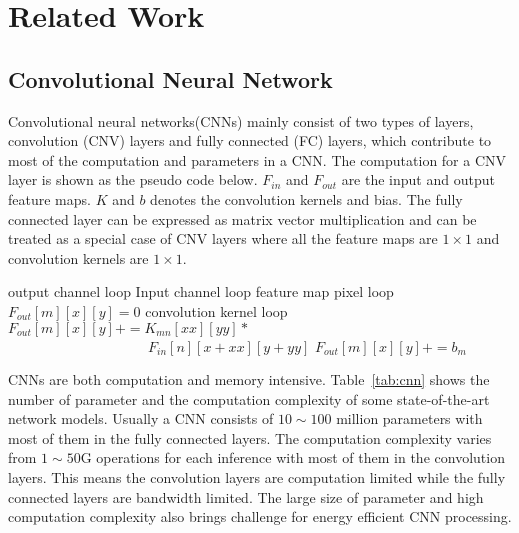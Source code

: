 \section{Related Work}\label{sec:related}


\subsection{Convolutional Neural Network}
Convolutional neural networks(CNNs) mainly consist of two types of layers, convolution (CNV) layers and fully connected (FC) layers, which contribute to most of the computation and parameters in a CNN. The computation for a CNV layer is shown as the pseudo code below. $F_{in}$ and $F_{out}$ are the input and output feature maps. $K$ and $b$ denotes the convolution kernels and bias. The fully connected layer can be expressed as matrix vector multiplication and can be treated as a special case of CNV layers where all the feature maps are $1\times 1$ and convolution kernels are $1\times 1$.

\begin{codebox}
\li \Comment output channel loop
\li {} 
  \Do
\li   \Comment Input channel loop
\li   {}
    \Do
\li  	\Comment feature map pixel loop
\li 	{}
    \Do
\li   	  $F_{out}[m][x][y]=0$
\li 	  \Comment convolution kernel loop
\li 	  {}
          \Do
\li 		$F_{out}[m][x][y] += K_{mn}[xx][yy]*$\\
      $\qquad\qquad\qquad\qquad\qquad F_{in}[n][x+xx][y+yy] $
          \End
\li 	  $F_{out}[m][x][y]+=b_m$
        \End 
    \End
    \End 
\end{codebox}

CNNs are both computation and memory intensive. Table~\ref{tab:cnn} shows the number of parameter and the computation complexity of some state-of-the-art network models. Usually a CNN consists of $10\sim 100$ million parameters with most of them in the fully connected layers. The computation complexity varies from $1\sim 50$G operations for each inference with most of them in the convolution layers. This means the convolution layers are computation limited while the fully connected layers are bandwidth limited. The large size of parameter and high computation complexity also brings challenge for energy efficient CNN processing.



